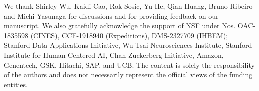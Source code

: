 \begin{ack}

We thank Shirley Wu, Kaidi Cao, Rok Sosic, Yu He, Qian Huang, Bruno Ribeiro and Michi Yasunaga for discussions and for providing feedback on our manuscript.
We also gratefully acknowledge the support of
NSF under Nos. OAC-1835598 (CINES), CCF-1918940 (Expeditions), DMS-2327709 (IHBEM);
Stanford Data Applications Initiative,
Wu Tsai Neurosciences Institute,
Stanford Institute for Human-Centered AI,
Chan Zuckerberg Initiative,
Amazon, Genentech, GSK, Hitachi, SAP, and UCB.
The content is solely the responsibility of the authors and does not necessarily represent the official views of the funding entities.


\end{ack}

